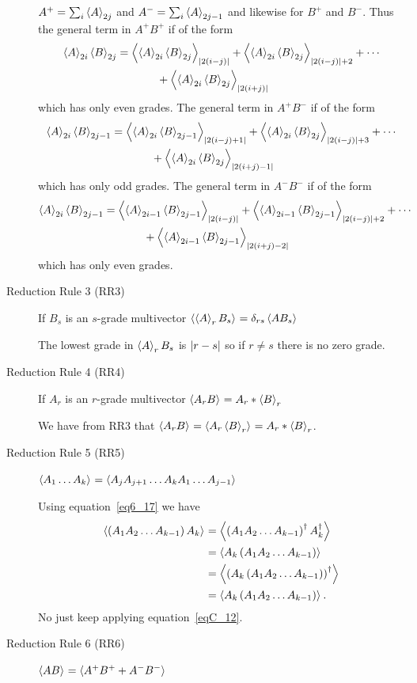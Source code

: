 \begin{description}
		$A^{+} = \sum_{i}\grd{A}{2j}$ and $A^{-} = \sum_{i}\grd{A}{2j-1}$ and likewise for $B^{+}$ and $B^{-}$. Thus the general
		term in $A^{+}B^{+}$ if of the form
		\begin{align}
			\grd{A}{2i}\grd{B}{2j} &= \grd{\grd{A}{2i}\grd{B}{2j}}{\abs{2(i-j)}}+\grd{\grd{A}{2i}\grd{B}{2j}}{\abs{2(i-j)}+2}+\cdots \nonumber \\
			                       &\hspace{0.5in}+\grd{\grd{A}{2i}\grd{B}{2j}}{\abs{2(i+j)}}
		\end{align}
		which has only even grades. The general term in $A^{+}B^{-}$ if of the form
		\begin{align}
			\grd{A}{2i}\grd{B}{2j-1} &= \grd{\grd{A}{2i}\grd{B}{2j-1}}{\abs{2(i-j)+1}}+\grd{\grd{A}{2i}\grd{B}{2j}}{\abs{2(i-j)}+3}+\cdots \nonumber \\
			                         &\hspace{0.5in}+\grd{\grd{A}{2i}\grd{B}{2j}}{\abs{2(i+j)-1}}
		\end{align}
		which has only odd grades. The general term in $A^{-}B^{-}$ if of the form
		\begin{align}
			\grd{A}{2i}\grd{B}{2j-1} &= \grd{\grd{A}{2i-1}\grd{B}{2j-1}}{\abs{2(i-j)}}+\grd{\grd{A}{2i-1}\grd{B}{2j-1}}{\abs{2(i-j)}+2}+\cdots \nonumber \\
			                         &\hspace{0.5in}+\grd{\grd{A}{2i-1}\grd{B}{2j-1}}{\abs{2(i+j)-2}}
		\end{align}
		which has only even grades.
	\item[Reduction Rule 3 (RR3)] If $B_{s}$ is an $s$-grade multivector $\grd{\grd{A}{r}B_{s}}{} = \delta_{rs}\grd{AB_{s}}{}$
	
	The lowest grade in $\grd{A}{r}B_{s}$ is $\abs{r-s}$ so if $r\ne s$ there is no zero grade.
	\item[Reduction Rule 4 (RR4)] If $A_{r}$ is an $r$-grade multivector $\grd{A_{r}B}{} = A_{r}*\grd{B}{r}$
	
	We have from RR3 that $\grd{A_{r}B}{} = \grd{A_{r}\grd{B}{r}}{} = A_{r}*\grd{B}{r}$. 
	\item[Reduction Rule 5 (RR5)]\label{RR5} $\grd{A_{1}\dots A_{k}}{} = \grd{A_{j}A_{j+1}\dots A_{k}A_{1}\dots A_{j-1}}{}$
	
	Using equation~\ref{eq6_17} we have
	\begin{align}
		\grd{\paren{A_{1}A_{2}\dots A_{k-1}}A_{k}}{} &= \grd{\paren{A_{1}A_{2}\dots A_{k-1}}^{\R}A_{k}^{\R}}{} \nonumber \\
		                                             &= \grd{A_{k}\paren{A_{1}A_{2}\dots A_{k-1}}}{} \nonumber \\
		                                             &= \grd{\paren{A_{k}\paren{A_{1}A_{2}\dots A_{k-1}}}^{\R}}{} \nonumber \\
		                                             &= \grd{A_{k}\paren{A_{1}A_{2}\dots A_{k-1}}}{} \label{eqC_12}.
	\end{align}
	No just keep applying equation~\ref{eqC_12}.
	\item[Reduction Rule 6 (RR6)] $\grd{AB}{} = \grd{A^{+}B^{+}+A^{-}B^{-}}{}$
	

\end{description}
